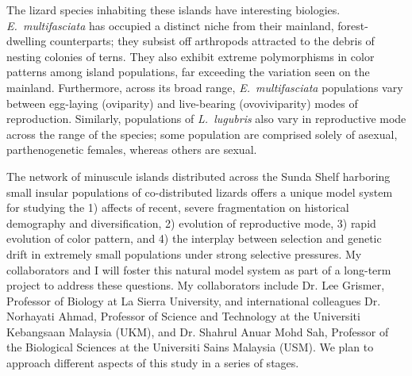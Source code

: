 \documentclass[10pt]{article}
\begin{document}
The lizard species inhabiting these islands have interesting biologies.
\emph{E.\ multifasciata} has occupied a distinct niche from their mainland, forest-dwelling counterparts; they subsist off arthropods attracted to the debris of nesting colonies of terns.
They also exhibit extreme polymorphisms in color patterns among island populations, far exceeding the variation seen on the mainland.
Furthermore, across its broad range, \emph{E.\ multifasciata} populations vary between egg-laying (oviparity) and live-bearing (ovoviviparity) modes of reproduction.
Similarly, populations of \emph{L.\ lugubris} also vary in reproductive mode across the range of the species; some population are comprised solely of asexual, parthenogenetic females, whereas others are sexual.

The network of minuscule islands distributed across the Sunda Shelf harboring small insular populations of co-distributed lizards offers a unique model system for studying the 
1) affects of recent, severe fragmentation on historical demography and diversification,
2) evolution of reproductive mode,
3) rapid evolution of color pattern, and 
4) the interplay between selection and genetic drift in extremely small populations under strong selective pressures.
My collaborators and I will foster this natural model system as part of a long-term project to address these questions.
My collaborators include
Dr. Lee Grismer, Professor of Biology at La Sierra University, and international colleagues
Dr. Norhayati Ahmad, Professor of Science and Technology at the Universiti Kebangsaan Malaysia (UKM), and
Dr. Shahrul Anuar Mohd Sah, Professor of the Biological Sciences at the Universiti Sains Malaysia (USM).
We plan to approach different aspects of this study in a series of stages.
\end{document}
